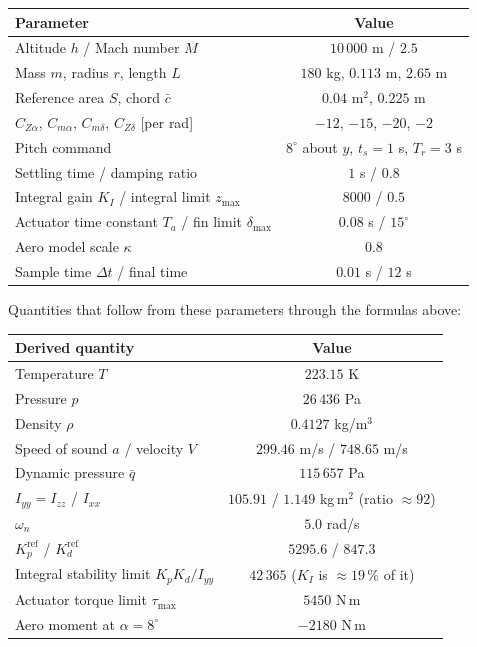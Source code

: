 \documentclass[11pt, a4paper]{article}
\begin{document}
\begin{center}
\begin{tabular}{lc}
\toprule
\textbf{Parameter} & \textbf{Value} \\
\midrule
Altitude $h$ / Mach number $M$ & $10\,000$ m / $2.5$ \\
Mass $m$, radius $r$, length $L$ & $180$ kg, $0.113$ m, $2.65$ m \\
Reference area $S$, chord $\bar{c}$ & $0.04$ m$^2$, $0.225$ m \\
$C_{Z\alpha}$, $C_{m\alpha}$, $C_{m\delta}$, $C_{Z\delta}$ [per rad] & $-12$, $-15$, $-20$, $-2$ \\
Pitch command & $8^\circ$ about $y$, $t_s = 1$ s, $T_r = 3$ s \\
Settling time / damping ratio & $1$ s / $0.8$ \\
Integral gain $K_I$ / integral limit $z_{\max}$ & $8000$ / $0.5$ \\
Actuator time constant $T_a$ / fin limit $\delta_{\max}$ & $0.08$ s / $15^\circ$ \\
Aero model scale $\kappa$ & $0.8$ \\
Sample time $\Delta t$ / final time & $0.01$ s / $12$ s \\
\bottomrule
\end{tabular}
\end{center}

Quantities that follow from these parameters through the formulas above:

\begin{center}
\begin{tabular}{lc}
\toprule
\textbf{Derived quantity} & \textbf{Value} \\
\midrule
Temperature $T$ & $223.15$ K \\
Pressure $p$ & $26\,436$ Pa \\
Density $\rho$ & $0.4127$ kg/m$^3$ \\
Speed of sound $a$ / velocity $V$ & $299.46$ m/s / $748.65$ m/s \\
Dynamic pressure $\bar{q}$ & $115\,657$ Pa \\
$I_{yy} = I_{zz}$ / $I_{xx}$ & $105.91$ / $1.149$ kg\,m$^2$ (ratio $\approx 92$) \\
$\omega_n$ & $5.0$ rad/s \\
$K_p^{\text{ref}}$ / $K_d^{\text{ref}}$ & $5295.6$ / $847.3$ \\
Integral stability limit $K_p K_d / I_{yy}$ & $42\,365$ ($K_I$ is $\approx 19\,\%$ of it) \\
Actuator torque limit $\tau_{\max}$ & $5450$ N\,m \\
Aero moment at $\alpha = 8^\circ$ & $-2180$ N\,m \\
\bottomrule
\end{tabular}
\end{center}
\end{document}
